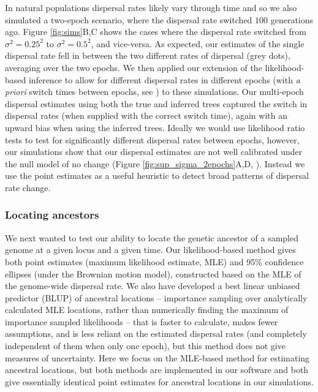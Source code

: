 \documentclass[12pt]{article}
\begin{document}
In natural populations dispersal rates likely vary through time and so we also simulated a two-epoch scenario, where the dispersal rate switched $100$ generations ago. 
Figure \ref{fig:sims}B,C shows the cases where the dispersal rate switched from $\sigma^2 = 0.25^2$ to $\sigma^2 = 0.5^2$, and vice-versa. 
As expected, our estimates of the single dispersal rate fell in between the two different rates of dispersal (grey dots), averaging over the two epochs. 
We then applied our extension of the likelihood-based inference to allow for different dispersal rates in different epochs (with \textit{a priori} switch times between epochs, see ) to these simulations. 
Our multi-epoch dispersal estimates using both the true and inferred trees captured the switch in dispersal rates (when supplied with the correct switch time), again with an upward bias when using the inferred trees. 
Ideally we would use likelihood ratio tests to test for significantly different dispersal rates between epochs, however, our simulations show that our dispersal estimates are not well calibrated under the null model of no change (Figure \ref{fig:sup_sigma_2epochs}A,D, ). 
Instead we use the point estimates as a useful heuristic to detect broad patterns of dispersal rate change.

\subsubsection*{Locating ancestors}

We next wanted to test our ability to locate the genetic ancestor of a sampled genome at a given locus and a given time.
Our likelihood-based method gives both point estimates (maximum likelihood estimate, MLE) and 95\% confidence ellipses (under the Brownian motion model), constructed based on the MLE of the genome-wide dispersal rate. 
We also have developed a best linear unbiased predictor (BLUP) of ancestral locations -- importance sampling over analytically calculated MLE locations, rather than numerically finding the maximum of importance sampled likelihoods -- that is faster to calculate, makes fewer assumptions, and is less reliant on the estimated dispersal rates (and completely independent of them when only one epoch), but this method does not give measures of uncertainty. 
Here we focus on the MLE-based method for estimating ancestral locations, but both methods are implemented in our software and both give essentially identical point estimates for ancestral locations in our simulations.
\end{document}
